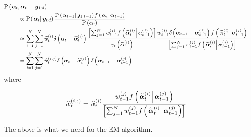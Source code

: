 \documentclass[9pt, notitlepage]{article}
\renewcommand{\vec}[1]{\bm{#1}}
\newcommand{\Lbrac}[1]{\left[ #1\right]}
\newcommand{\Lparen}[1]{\left( #1\right)}
\newcommand{\Cond}[2]{\left. #1 \vphantom{#2} \right\vert  #2}
\newcommand{\Prob}{\text{P}}
\newcommand{\optor}[2]{#1\Lparen{#2}}
\newcommand{\optorC}[3]{\optor{#1}{\Cond{#2}{#3}}}
\newcommand{\prop}[1]{\optor{\Prob}{#1}}
\newcommand{\propC}[2]{\optorC{\Prob}{#1}{#2}}
\newcommand{\dirac}[1]{\optor{\delta}{#1}}
\newcommand{\partic}[3]{#1_{#2}^{\Lparen{#3}}}
\newcommand{\particB}[3]{\widetilde{#1}_{#2}^{\Lparen{#3}}}
\newcommand{\particS}[3]{\widehat{#1}_{#2}^{\Lparen{#3}}}
\newcommand{\nPart}{N}
\newcommand{\nPeriods}{d}
\begin{document}
\begin{equation}\begin{split}
\propC{\vec{\alpha}_t, \vec{\alpha}_{t-1}}{\vec{y}_{1:\nPeriods}} \hspace{-50pt} & \hspace{50pt} \\
%
& \propto
	\propC{\vec{\alpha}_t}{\vec{y}_{t:\nPeriods}}
	\frac{
		\propC{\vec{\alpha}_{t-1}}{\vec{y}_{1:{t-1}}}
		\optorC{f}{\vec{\alpha}_t}{\vec{\alpha}_{t - 1}}
	}{ \prop{\vec{\alpha}_t} } \\
%
& \approx \sum_{i=1}^\nPart\sum_{j=1}^\nPart
	\particB{w}{t}{i}
	\dirac{\vec{\alpha}_t - \particB{\vec{\alpha}}{t}{i}}
	\frac{
		\Lbrac{\sum_{j = 1}^\nPart
		\partic{w}{t -1}{j}
		\optorC{f}{\particB{\vec{\alpha}}{t}{i}}{\partic{\vec{\alpha}}{t - 1}{j}}}
	}{ \optor{\gamma_t}{\particB{\vec{\alpha}}{t}{i}} }
	\frac{
		\partic{w}{t -1}{j}
		\dirac{\vec{\alpha}_{t -1} - \partic{\vec{\alpha}}{t - 1}{j}}
		\optorC{f}{\particB{\vec{\alpha}}{t}{i}}{\partic{\vec{\alpha}}{t - 1}{j}}
	}{
		\Lbrac{\sum_{j = 1}^\nPart
		\partic{w}{t -1}{j}
		\optorC{f}{\particB{\vec{\alpha}}{t}{i}}{\partic{\vec{\alpha}}{t - 1}{j}}}
	} \\
%
& = \sum_{i=1}^\nPart\sum_{j=1}^\nPart
	\particS{w}{t}{i,j}
	\dirac{\vec{\alpha}_t - \particB{\vec{\alpha}}{t}{i}}
	\dirac{\vec{\alpha}_{t -1} - \partic{\vec{\alpha}}{t - 1}{j}} \\
\end{split}\end{equation}
%
%
where

\begin{equation}
\particS{w}{t}{i,j} = \particS{w}{t}{i}
	\frac{
		\partic{w}{t -1}{j}
		\optorC{f}{\particB{\vec{\alpha}}{t}{i}}{\partic{\vec{\alpha}}{t - 1}{j}}
	}{
		\Lbrac{\sum_{j = 1}^\nPart
		\partic{w}{t -1}{j}
		\optorC{f}{\particB{\vec{\alpha}}{t}{i}}{\partic{\vec{\alpha}}{t - 1}{j}}}
	}
\end{equation}

The above is what we need for the EM-algorithm.
\end{document}
